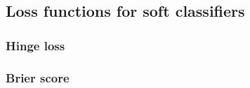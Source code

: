 
\subsection{Loss functions for soft classifiers}

\subsubsection{Hinge loss}

\subsubsection{Brier score}

